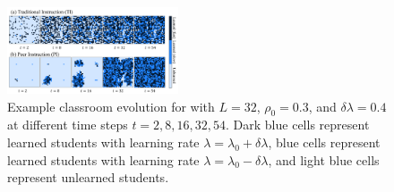\documentclass[twocolumn,secnumarabic,amssymb, nobibnotes, aps, prd]{revtex4-2}
\begin{document}

        
        

        
        
    \begin{figure}[htbp!]
        \centering
        \includegraphics[width=0.45\textwidth]{figures/2D-BPCAIH-analysis/class evolutions/class_evolution.png}
        \caption{
            Example classroom evolution for with $L=32$, $\rho_0=0.3$, and $\delta\lambda=0.4$ at different time steps $t=2,8,16,32,54$.
            Dark blue cells represent learned students with learning rate $\lambda=\lambda_0+\delta\lambda$, blue cells represent learned students with learning rate $\lambda=\lambda_0-\delta\lambda$, and light blue cells represent unlearned students.
        }\label{fig:class_evolution}
    \end{figure}
\end{document}
